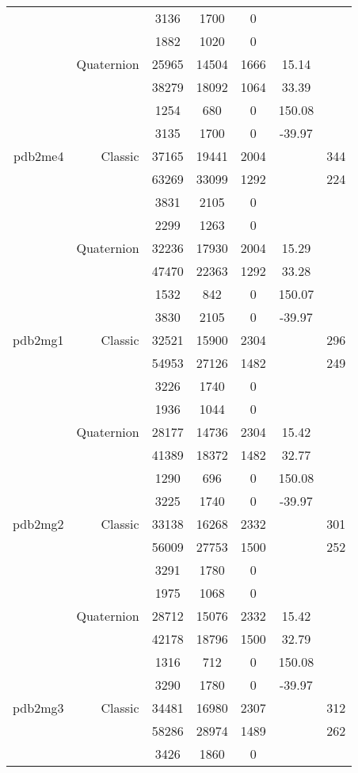 \begin{xltabular}{\textwidth}{r|rcccSc}
& & 3136 & 1700 & 0 & & \\
& & 1882 & 1020 & 0 & & \\
& Quaternion & 25965 & 14504 & 1666 & 15.14 & \\
& & 38279 & 18092 & 1064 & 33.39 & \\
& & 1254 & 680 & 0 & 150.08 & \\
& & 3135 & 1700 & 0 & -39.97 & \\ \addlinespace
pdb2me4 & Classic & 37165 & 19441 & 2004 & & 344 \\
& & 63269 & 33099 & 1292 & & 224 \\
& & 3831 & 2105 & 0 & & \\
& & 2299 & 1263 & 0 & & \\
& Quaternion & 32236 & 17930 & 2004 & 15.29 & \\
& & 47470 & 22363 & 1292 & 33.28 & \\
& & 1532 & 842 & 0 & 150.07 & \\
& & 3830 & 2105 & 0 & -39.97 & \\ \addlinespace
pdb2mg1 & Classic & 32521 & 15900 & 2304 & & 296 \\
& & 54953 & 27126 & 1482 & & 249 \\
& & 3226 & 1740 & 0 & & \\
& & 1936 & 1044 & 0 & & \\
& Quaternion & 28177 & 14736 & 2304 & 15.42 & \\
& & 41389 & 18372 & 1482 & 32.77 & \\
& & 1290 & 696 & 0 & 150.08 & \\
& & 3225 & 1740 & 0 & -39.97 & \\ \addlinespace
pdb2mg2 & Classic & 33138 & 16268 & 2332 & & 301 \\
& & 56009 & 27753 & 1500 & & 252 \\
& & 3291 & 1780 & 0 & & \\
& & 1975 & 1068 & 0 & & \\
& Quaternion & 28712 & 15076 & 2332 & 15.42 & \\
& & 42178 & 18796 & 1500 & 32.79 & \\
& & 1316 & 712 & 0 & 150.08 & \\
& & 3290 & 1780 & 0 & -39.97 & \\ \addlinespace
pdb2mg3 & Classic & 34481 & 16980 & 2307 & & 312 \\
& & 58286 & 28974 & 1489 & & 262 \\
& & 3426 & 1860 & 0 & & \\

\end{xltabular}
